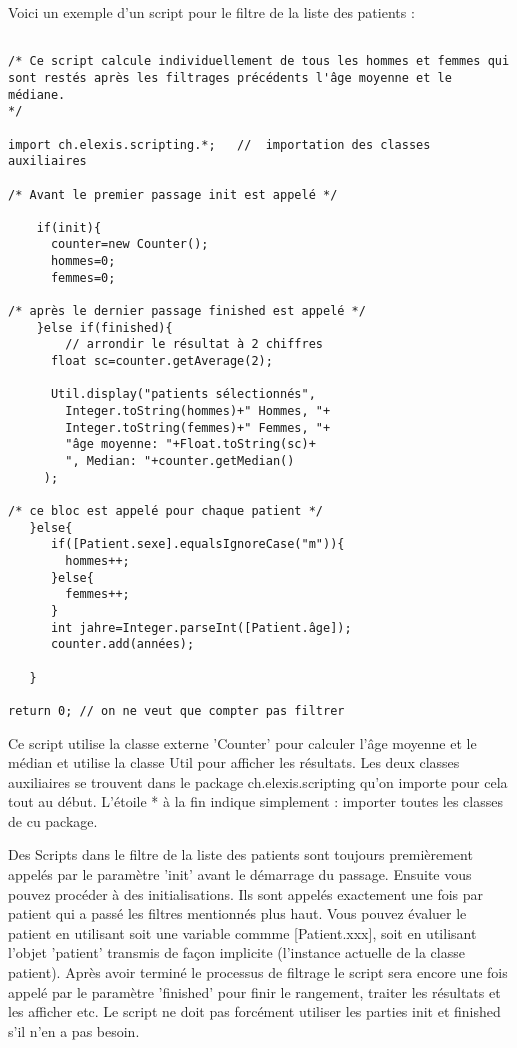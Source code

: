 \documentclass[a4paper]{scrartcl}
\begin{document}
Voici un exemple d'un script pour le filtre de la liste des patients :
\begin{small}
\begin{verbatim}

/* Ce script calcule individuellement de tous les hommes et femmes qui sont restés après les filtrages précédents l'âge moyenne et le médiane.
*/

import ch.elexis.scripting.*;	//  importation des classes auxiliaires

/* Avant le premier passage init est appelé */

    if(init){					
      counter=new Counter();				
      hommes=0;					
      femmes=0;

/* après le dernier passage finished est appelé */
    }else if(finished){				
        // arrondir le résultat à 2 chiffres
      float sc=counter.getAverage(2);

      Util.display("patients sélectionnés",
        Integer.toString(hommes)+" Hommes, "+
        Integer.toString(femmes)+" Femmes, "+
        "âge moyenne: "+Float.toString(sc)+
        ", Median: "+counter.getMedian()
     );

/* ce bloc est appelé pour chaque patient */
   }else{
      if([Patient.sexe].equalsIgnoreCase("m")){
        hommes++;
      }else{
        femmes++;
      }
      int jahre=Integer.parseInt([Patient.âge]);
      counter.add(années);

   }

return 0; // on ne veut que compter pas filtrer

\end{verbatim}
\end{small}

\medskip

Ce script utilise la classe externe 'Counter' pour calculer l'âge moyenne et le médian et utilise la classe Util pour afficher les résultats. Les deux classes auxiliaires se trouvent dans le package ch.elexis.scripting qu'on importe pour cela tout au début. L'étoile * à la fin indique simplement : importer toutes les classes de cu package.

\vspace{3mm}

Des Scripts dans le filtre de la liste des patients sont toujours premièrement appelés par le paramètre 'init' avant le démarrage du passage. Ensuite vous pouvez procéder à des initialisations. Ils sont appelés exactement une fois par patient qui a passé les filtres mentionnés plus haut. Vous pouvez évaluer le patient en utilisant soit une variable commme [Patient.xxx], soit en utilisant l'objet 'patient' transmis de façon implicite  (l'instance actuelle de la classe patient). Après avoir terminé le processus de filtrage le script sera encore une fois appelé par le paramètre 'finished' pour finir le rangement, traiter les résultats et les afficher etc. Le script ne doit pas forcément utiliser les parties init et finished s'il n'en a pas besoin.
\end{document}

